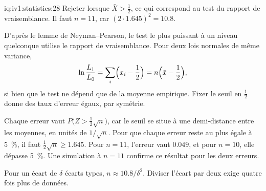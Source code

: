\begin{solution}{iq:iv1:statistics:28}
Rejeter lorsque $\bar{X} > \tfrac12$, ce qui correspond au test du rapport de vraisemblance. Il faut $n = 11$, car $(2 \cdot 1.645)^2 = 10.8$.

D'après le lemme de Neyman--Pearson, le test le plus puissant à un niveau quelconque utilise le rapport de vraisemblance. Pour deux lois normales de même variance,
\[
\ln\frac{L_1}{L_0} = \sum_i \Bigl(x_i - \frac12\Bigr) = n\Bigl(\bar{x} - \frac12\Bigr),
\]
si bien que le test ne dépend que de la moyenne empirique. Fixer le seuil en $\tfrac12$ donne des taux d'erreur égaux, par symétrie.

Chaque erreur vaut $P\bigl(Z > \tfrac12\sqrt{n}\bigr)$, car le seuil se situe à une demi-distance entre les moyennes, en unités de $1/\sqrt{n}$. Pour que chaque erreur reste au plus égale à 5~\%, il faut $\tfrac12\sqrt{n} \ge 1.645$. Pour $n = 11$, l'erreur vaut $0.049$, et pour $n = 10$, elle dépasse 5~\%. Une simulation à $n = 11$ confirme ce résultat pour les deux erreurs.

Pour un écart de $\delta$ écarts types, $n \approx 10.8/\delta^2$. Diviser l'écart par deux exige quatre fois plus de données.

\end{solution}

